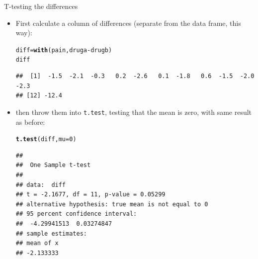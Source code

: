 \documentclass[unknownkeysallowed]{beamer}\usepackage[]{graphicx}\usepackage[]{color}
\makeatletter
\newcommand{\hlnum}[1]{\textcolor[rgb]{0.686,0.059,0.569}{#1}}%
\newcommand{\hlopt}[1]{\textcolor[rgb]{0,0,0}{#1}}%
\newcommand{\hlstd}[1]{\textcolor[rgb]{0.345,0.345,0.345}{#1}}%
\newcommand{\hlkwb}[1]{\textcolor[rgb]{0.69,0.353,0.396}{#1}}%
\newcommand{\hlkwc}[1]{\textcolor[rgb]{0.333,0.667,0.333}{#1}}%
\newcommand{\hlkwd}[1]{\textcolor[rgb]{0.737,0.353,0.396}{\textbf{#1}}}%
\newenvironment{kframe}{%
 \def\at@end@of@kframe{}%
 \ifinner\ifhmode%
  \def\at@end@of@kframe{\end{minipage}}%
  \begin{minipage}{\columnwidth}%
 \fi\fi%
 \def\FrameCommand##1{\hskip\@totalleftmargin \hskip-\fboxsep
 \colorbox{shadecolor}{##1}\hskip-\fboxsep
     \hskip-\linewidth \hskip-\@totalleftmargin \hskip\columnwidth}%
 \MakeFramed {\advance\hsize-\width
   \@totalleftmargin\z@ \linewidth\hsize
   \@setminipage}}%
 {\par\unskip\endMakeFramed%
 \at@end@of@kframe}
\newenvironment{knitrout}{}{} %
\makeatother
\begin{document}
\begin{frame}[fragile]{T-testing the differences}
  
  \begin{itemize}
  \item First calculate a column of differences (separate from the
    data frame, this way):
    
\begin{knitrout}\footnotesize
{}\color{fgcolor}\begin{kframe}
\begin{alltt}
\hlstd{diff}\hlkwb{=}\hlkwd{with}\hlstd{(pain,druga}\hlopt{-}\hlstd{drugb)}
\hlstd{diff}
\end{alltt}
\begin{verbatim}
##  [1]  -1.5  -2.1  -0.3   0.2  -2.6   0.1  -1.8   0.6  -1.5  -2.0  -2.3
## [12] -12.4
\end{verbatim}
\end{kframe}
\end{knitrout}
\item then throw them into \texttt{t.test}, testing that the mean is
  zero, with same result as before: 
  
\begin{knitrout}\footnotesize
{}\color{fgcolor}\begin{kframe}
\begin{alltt}
\hlkwd{t.test}\hlstd{(diff,}\hlkwc{mu}\hlstd{=}\hlnum{0}\hlstd{)}
\end{alltt}
\begin{verbatim}
## 
## 	One Sample t-test
## 
## data:  diff
## t = -2.1677, df = 11, p-value = 0.05299
## alternative hypothesis: true mean is not equal to 0
## 95 percent confidence interval:
##  -4.29941513  0.03274847
## sample estimates:
## mean of x 
## -2.133333
\end{verbatim}
\end{kframe}
\end{knitrout}

  \end{itemize}
  
\end{frame}

%  
%    
%  
\end{document}
